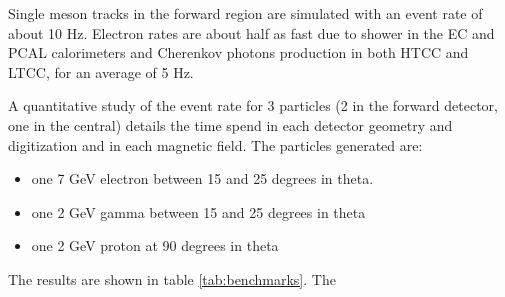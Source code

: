 Single meson tracks in the forward region are simulated with an event rate of about 10 Hz.
Electron rates are about half as fast due to shower in the EC and PCAL calorimeters and
Cherenkov photons production in both HTCC and LTCC, for an average of 5 Hz.

A quantitative study of the event rate for 3 particles (2 in the forward detector, one in the central)
details the time spend in each detector geometry and digitization and in each magnetic field.
The particles generated are:

\begin{itemize}
	\item one 7 GeV electron between 15 and 25 degrees in theta.
	\item one 2 GeV gamma between 15 and 25 degrees in theta
	\item one 2 GeV proton at 90 degrees in theta
\end{itemize}

The results are shown in table \ref{tab:benchmarks}. The 

